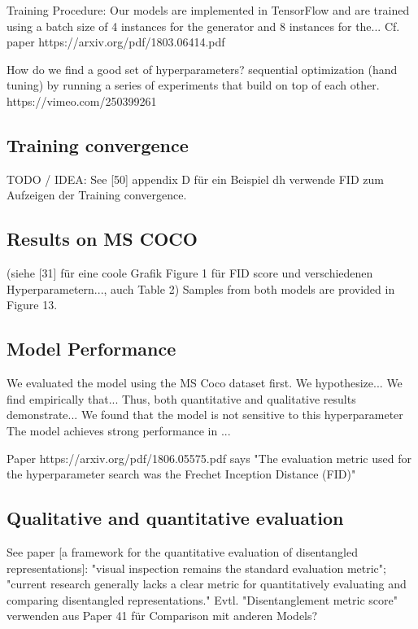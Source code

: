 \documentclass[12pt,a4paper]{article}
\begin{document}
\par Training Procedure: Our models are implemented in TensorFlow \cite{1605.08695} and are trained using a batch size of 4 instances for the generator and 8 instances for the...
Cf. paper https://arxiv.org/pdf/1803.06414.pdf

\par How do we find a good set of hyperparameters? sequential optimization (hand tuning) by running a series of experiments that build on top of each other. https://vimeo.com/250399261

\subsection{Training convergence}
TODO / IDEA: See [50] appendix D für ein Beispiel dh verwende FID zum Aufzeigen der Training convergence.

\subsection{Results on MS COCO}
(siehe [31] für eine coole Grafik Figure 1 für FID score und verschiedenen Hyperparametern..., auch Table 2)
Samples from both models are provided in Figure 13.

\subsection{Model Performance}
We evaluated the model using the MS Coco dataset first.
We hypothesize...
We find empirically that...
Thus, both quantitative and qualitative results demonstrate...
We found that the model is not sensitive to this hyperparameter
The model achieves strong performance in ...

\par Paper https://arxiv.org/pdf/1806.05575.pdf says "The evaluation metric used for the hyperparameter search was the Frechet Inception Distance (FID)"

\subsection{Qualitative and quantitative evaluation}
See paper [a framework for the quantitative evaluation of disentangled representations]: "visual inspection remains the standard evaluation metric"; "current research generally lacks a clear metric for quantitatively evaluating and comparing disentangled representations."
Evtl. "Disentanglement metric score" verwenden aus Paper 41 für Comparison mit anderen Models?
\end{document}
